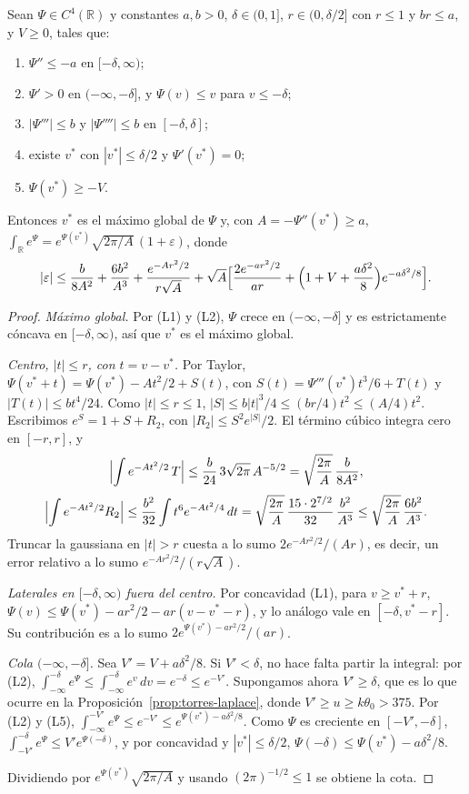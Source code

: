 \begin{lema}\label{lem:torres-laplace}
Sean $\Psi\in C^4(\mathbb R)$ y constantes $a,b>0$, $\delta\in(0,1]$, $r\in(0,\delta/2]$ con $r\le1$ y
$br\le a$, y $V\ge0$, tales que:
\begin{enumerate}[label=(L\arabic*)]
\item $\Psi''\le-a$ en $[-\delta,\infty)$;
\item $\Psi'>0$ en $(-\infty,-\delta]$, y $\Psi(v)\le v$ para $v\le-\delta$;
\item $|\Psi'''|\le b$ y $|\Psi''''|\le b$ en $[-\delta,\delta]$;
\item existe $v^*$ con $|v^*|\le\delta/2$ y $\Psi'(v^*)=0$;
\item $\Psi(v^*)\ge-V$.
\end{enumerate}
Entonces $v^*$ es el máximo global de $\Psi$ y, con $A=-\Psi''(v^*)\ge a$,
$\int_{\mathbb R}e^{\Psi}=e^{\Psi(v^*)}\sqrt{2\pi/A}\,(1+\varepsilon)$, donde
\[
 |\varepsilon|\le\frac b{8A^2}+\frac{6b^2}{A^3}+\frac{e^{-Ar^2/2}}{r\sqrt A}
 +\sqrt A\Bigl[\frac{2e^{-ar^2/2}}{ar}+\Bigl(1+V+\frac{a\delta^2}8\Bigr)e^{-a\delta^2/8}\Bigr].
\]
\end{lema}
\begin{proof}
\emph{Máximo global.} Por (L1) y (L2), $\Psi$ crece en $(-\infty,-\delta]$ y es estrictamente cóncava en
$[-\delta,\infty)$, así que $v^*$ es el máximo global.

\emph{Centro, $|t|\le r$, con $t=v-v^*$.} Por Taylor, $\Psi(v^*+t)=\Psi(v^*)-At^2/2+S(t)$, con
$S(t)=\Psi'''(v^*)t^3/6+T(t)$ y $|T(t)|\le bt^4/24$. Como $|t|\le r\le1$,
$|S|\le b|t|^3/4\le(br/4)t^2\le(A/4)t^2$. Escribimos $e^S=1+S+R_2$, con $|R_2|\le S^2e^{|S|}/2$. El término
cúbico integra cero en $[-r,r]$, y
\[
 \Bigl|\int e^{-At^2/2}\,T\Bigr|\le\frac b{24}\,3\sqrt{2\pi}\,A^{-5/2}=\sqrt{\frac{2\pi}A}\,\frac b{8A^2},
\]
\[
 \Bigl|\int e^{-At^2/2}R_2\Bigr|\le\frac{b^2}{32}\int t^6e^{-At^2/4}\,dt
 =\sqrt{\frac{2\pi}A}\,\frac{15\cdot2^{7/2}}{32}\,\frac{b^2}{A^3}\le\sqrt{\frac{2\pi}A}\,\frac{6b^2}{A^3}.
\]
Truncar la gaussiana en $|t|>r$ cuesta a lo sumo $2e^{-Ar^2/2}/(Ar)$, es decir, un error relativo a lo
sumo $e^{-Ar^2/2}/(r\sqrt A)$.

\emph{Laterales en $[-\delta,\infty)$ fuera del centro.} Por concavidad (L1), para $v\ge v^*+r$,
$\Psi(v)\le\Psi(v^*)-ar^2/2-ar(v-v^*-r)$, y lo análogo vale en $[-\delta,v^*-r]$. Su contribución es a lo
sumo $2e^{\Psi(v^*)-ar^2/2}/(ar)$.

\emph{Cola $(-\infty,-\delta]$.} Sea $V'=V+a\delta^2/8$. Si $V'<\delta$, no hace falta partir la integral:
por (L2), $\int_{-\infty}^{-\delta}e^\Psi\le\int_{-\infty}^{-\delta}e^v\,dv=e^{-\delta}\le e^{-V'}$.
Supongamos ahora $V'\ge\delta$, que es lo que ocurre en la Proposición~\ref{prop:torres-laplace}, donde
$V'\ge u\ge k\theta_0>375$. Por (L2) y (L5),
$\int_{-\infty}^{-V'}e^\Psi\le e^{-V'}\le e^{\Psi(v^*)-a\delta^2/8}$.
Como $\Psi$ es creciente en $[-V',-\delta]$, $\int_{-V'}^{-\delta}e^\Psi\le V'e^{\Psi(-\delta)}$, y por
concavidad y $|v^*|\le\delta/2$, $\Psi(-\delta)\le\Psi(v^*)-a\delta^2/8$.

Dividiendo por $e^{\Psi(v^*)}\sqrt{2\pi/A}$ y usando $(2\pi)^{-1/2}\le1$ se obtiene la cota.
\end{proof}
